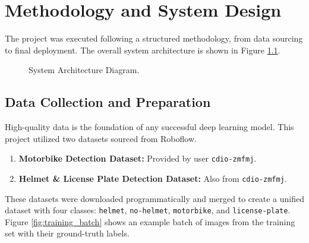 \chapter{Methodology and System Design}
The project was executed following a structured methodology, from data sourcing to final deployment. The overall system architecture is shown in Figure \ref{fig:architecture}.

\vspace{0.5cm}
\begin{figure}[H]
    \centering
    \caption{System Architecture Diagram.}
    \label{fig:architecture}
\end{figure}

\section{Data Collection and Preparation}
High-quality data is the foundation of any successful deep learning model. This project utilized two datasets sourced from Roboflow.
\begin{enumerate}
    \item \textbf{Motorbike Detection Dataset:} Provided by user \texttt{cdio-zmfmj}.
    \item \textbf{Helmet \& License Plate Detection Dataset:} Also from \texttt{cdio-zmfmj}.
\end{enumerate}
These datasets were downloaded programmatically and merged to create a unified dataset with four classes: \texttt{helmet}, \texttt{no-helmet}, \texttt{motorbike}, and \texttt{license-plate}. Figure \ref{fig:training_batch} shows an example batch of images from the training set with their ground-truth labels.


